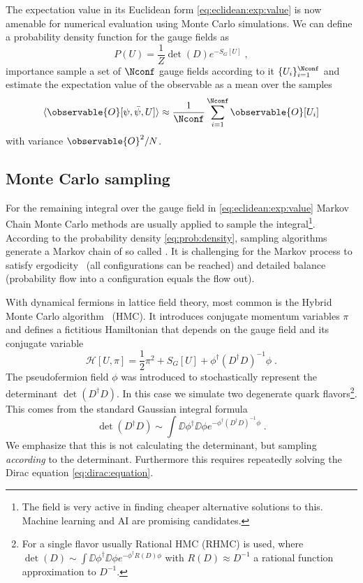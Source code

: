 The expectation value in its Euclidean form \cref{eq:eclidean:exp:value} is now amenable for numerical evaluation using Monte Carlo simulations.
We can define a probability density function for the gauge fields as
\begin{equation} \label{eq:prob:density}
P(U) = \frac{1}{Z} \det(D) e^{- S_G[U]} \;,
\end{equation}
importance sample a set of $\Nconf$ gauge fields according to it $\{U_i\}_{i=1}^{\Nconf}$ and estimate the expectation value of the observable as a mean over the samples
\begin{equation}
\langle \observable{O}[\psi, \bar{\psi}, U] \rangle \approx \frac{1}{\Nconf} \sum_{i=1}^{\Nconf} \observable{O}[U_i]
\end{equation}
with variance $\observable{O}^{2} / N$.


\subsection{Monte Carlo sampling}


For the remaining integral over the gauge field in \cref{eq:eclidean:exp:value} Markov Chain Monte Carlo methods are usually applied to sample the integral\footnote{The field is very active in finding cheaper alternative solutions to this. Machine learning and AI are promising candidates.}.
According to the probability density \cref{eq:prob:density}, sampling algorithms generate a Markov chain of so called .
It is challenging for the Markov process to satisfy ergodicity~\cite{10.1063/5.0004106,PhysRevLett.60.1243} (all configurations can be reached) and detailed balance (probability flow into a configuration equals the flow out).

With dynamical fermions in lattice field theory, most common is the Hybrid Monte Carlo algorithm~\cite{DUANE1987216} (HMC).
It introduces conjugate momentum variables $\pi$ and defines a fictitious Hamiltonian that depends on the gauge field and its conjugate variable
\begin{equation}
\mathcal{H}[U, \pi] = \frac{1}{2} \pi^{2} + S_{G}[U] + \phi^{\dagger} (D^{\dagger} D)^{-1} \phi \;.
\end{equation}
The pseudofermion field $\phi$ was introduced to stochastically represent the determinant $\det(D^{\dagger} D)$.
In this case we simulate two degenerate quark flavors\footnote{For a single flavor usually Rational HMC (RHMC) is used, where $\det(D) \sim \int \DD \phi^{\dagger} \DD \phi e^{-\phi^{\dagger} R(D) \phi}$ with $R(D) \approx D^{-1}$ a rational function approximation to $D^{-1}$.}.
This comes from the standard Gaussian integral formula
\begin{equation}
\det(D^{\dagger} D) \sim \int \DD \phi^{\dagger} \DD \phi e^{- \phi^{\dagger} ( D^{\dagger} D )^{-1} \phi} \;.
\end{equation}
We emphasize that this is not calculating the determinant, but sampling \emph{according} to the determinant.
Furthermore this requires repeatedly solving the Dirac equation \cref{eq:dirac:equation}.

